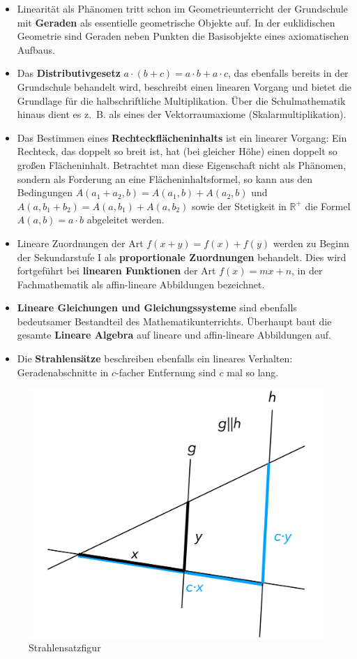 \documentclass[
]{scrbook}
\providecommand{\tightlist}{%
  \setlength{\itemsep}{0pt}\setlength{\parskip}{0pt}}
\theoremstyle{definition}
\theoremstyle{definition}
\theoremstyle{definition}
\theoremstyle{definition}
\theoremstyle{remark}
\begin{document}
\begin{itemize}
\tightlist
\item
  Linearität als Phänomen tritt schon im Geometrieunterricht der Grundschule mit \textbf{Geraden} als essentielle geometrische Objekte auf. In der euklidischen Geometrie sind Geraden neben Punkten die Basisobjekte eines axiomatischen Aufbaus.
\item
  Das \textbf{Distributivgesetz} \(a\cdot (b+c) = a\cdot b + a\cdot c\), das ebenfalls bereits in der Grundschule behandelt wird, beschreibt einen linearen Vorgang und bietet die Grundlage für die halbschriftliche Multiplikation. Über die Schulmathematik hinaus dient es z.~B. als eines der Vektorraumaxiome (Skalarmultiplikation).
\item
  Das Bestimmen eines \textbf{Rechteckflächeninhalts} ist ein linearer Vorgang: Ein Rechteck, das doppelt so breit ist, hat (bei gleicher Höhe) einen doppelt so großen Flächeninhalt. Betrachtet man diese Eigenschaft nicht als Phänomen, sondern als Forderung an eine Flächeninhaltsformel, so kann aus den Bedingungen \(A(a_1+a_2,b) = A(a_1,b) + A(a_2,b)\) und \(A(a,b_1+b_2) = A(a,b_1)+A(a,b_2)\) sowie der Stetigkeit in \(\mathbb{R}^+\) die Formel \(A(a,b) = a\cdot b\) abgeleitet werden.
\item
  Lineare Zuordnungen der Art \(f(x+y) = f(x)+f(y)\) werden zu Beginn der Sekundarstufe I als \textbf{proportionale Zuordnungen} behandelt. Dies wird fortgeführt bei \textbf{linearen Funktionen} der Art \(f(x) = mx+n\), in der Fachmathematik als affin-lineare Abbildungen bezeichnet.
\item
  \textbf{Lineare Gleichungen und Gleichungssysteme} sind ebenfalls bedeutsamer Bestandteil des Mathematikunterrichts. Überhaupt baut die gesamte \textbf{Lineare Algebra} auf lineare und affin-lineare Abbildungen auf.
\item
  Die \textbf{Strahlensätze} beschreiben ebenfalls ein lineares Verhalten: Geradenabschnitte in \(c\)-facher Entfernung sind \(c\) mal so lang.
\end{itemize}

\begin{figure}

{\centering \includegraphics[width=0.5\linewidth]{pictures/2-Strahlensatz} 

}

\caption{Strahlensatzfigur}\label{fig:Strahlensatz}
\end{figure}
\end{document}
